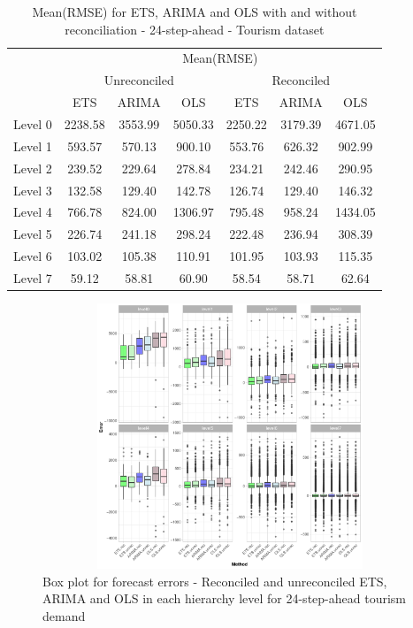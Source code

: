 \documentclass[11pt,a4paper,]{article}
\begin{document}
\begin{table}[t]

\caption{\label{tab:TourismdataresultRMSE}Mean(RMSE) for ETS, ARIMA and OLS with and without reconciliation - 24-step-ahead - Tourism dataset}
\centering
\begin{tabular}{ccccccc}
\toprule
\multicolumn{1}{c}{} & \multicolumn{6}{c}{Mean(RMSE)} \\
\cmidrule(l{2pt}r{2pt}){2-7}
\multicolumn{1}{c}{} & \multicolumn{3}{c}{Unreconciled} & \multicolumn{3}{c}{Reconciled} \\
\cmidrule(l{2pt}r{2pt}){2-4} \cmidrule(l{2pt}r{2pt}){5-7}
 & ETS & ARIMA & OLS & ETS & ARIMA & OLS\\
\midrule
Level 0 & 2238.58 & 3553.99 & 5050.33 & 2250.22 & 3179.39 & 4671.05\\
Level 1 & 593.57 & 570.13 & 900.10 & 553.76 & 626.32 & 902.99\\
Level 2 & 239.52 & 229.64 & 278.84 & 234.21 & 242.46 & 290.95\\
Level 3 & 132.58 & 129.40 & 142.78 & 126.74 & 129.40 & 146.32\\
Level 4 & 766.78 & 824.00 & 1306.97 & 795.48 & 958.24 & 1434.05\\
Level 5 & 226.74 & 241.18 & 298.24 & 222.48 & 236.94 & 308.39\\
Level 6 & 103.02 & 105.38 & 110.91 & 101.95 & 103.93 & 115.35\\
Level 7 & 59.12 & 58.81 & 60.90 & 58.54 & 58.71 & 62.64\\
\bottomrule
\end{tabular}
\end{table}

\begin{figure}

{\centering \includegraphics[width=450px,height=300px]{Paper-Figures/results_Tourism/boxplot_24} 

}

\caption{Box plot for forecast errors - Reconciled and unreconciled ETS, ARIMA and OLS in each hierarchy level for 24-step-ahead tourism demand}\label{fig:boxplottourism}
\end{figure}
\end{document}
